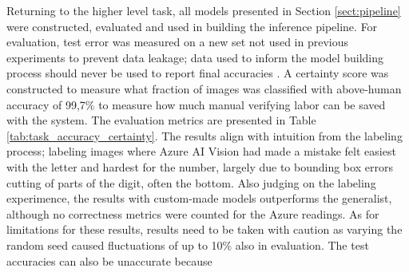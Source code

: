 \documentclass[english,twoside,openright]{UH_DS_MSc}
\begin{document}
Returning to the higher level task, all models presented in Section \ref{sect:pipeline} were constructed, evaluated and used 
in building the inference pipeline. For evaluation, test error was measured on a new set not used in previous experiments 
to prevent data leakage; data used to inform the model building process should never be used to report final accuracies \cite{engbook}.
A certainty score was constructed to measure what fraction of images was classified with above-human accuracy of 99,7\% to measure 
how much manual verifying labor can be saved with the system. The evaluation metrics are presented in Table \ref{tab:task_accuracy_certainty}.
The results align with intuition from the labeling process; labeling images 
where Azure AI Vision \cite{azurevision} had made a mistake felt easiest 
with the letter and hardest for the number, largely due to bounding box errors 
cutting of parts of the digit, often the bottom. Also judging on the labeling experimence,
the results with custom-made models outperforms the generalist, although no 
correctness metrics were counted for the Azure readings. 
As for limitations for these results, results need to 
be taken with caution as varying the random seed caused fluctuations of 
up to 10\% also in evaluation. The test accuracies can also be unaccurate because 
\end{document}
